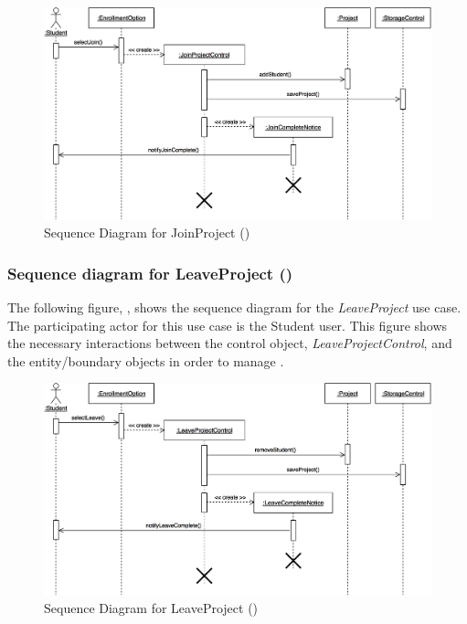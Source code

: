 \documentclass[12pt,letterpaper]{article}
\begin{document}
\begin{figure}[H]
	\centering{}
	\includegraphics[scale=0.25]{imgs/seq/join-project.png}
	\caption[ - Sequence Diagram for JoinProject]{Sequence Diagram for JoinProject ()}
\end{figure}

\subsubsection*{Sequence diagram for LeaveProject ()}

The following figure, , shows the sequence diagram for the {\it LeaveProject} use case. The participating actor for this use case is
the Student user. This figure shows the necessary interactions between the control object, {\it LeaveProjectControl}, and the
entity/boundary objects in order to manage .

\begin{figure}[H]
	\centering{}
	\includegraphics[scale=0.25]{imgs/seq/leave-project.png}
	\caption[ - Sequence Diagram for LeaveProject]{Sequence Diagram for LeaveProject ()}
\end{figure}
\end{document}
